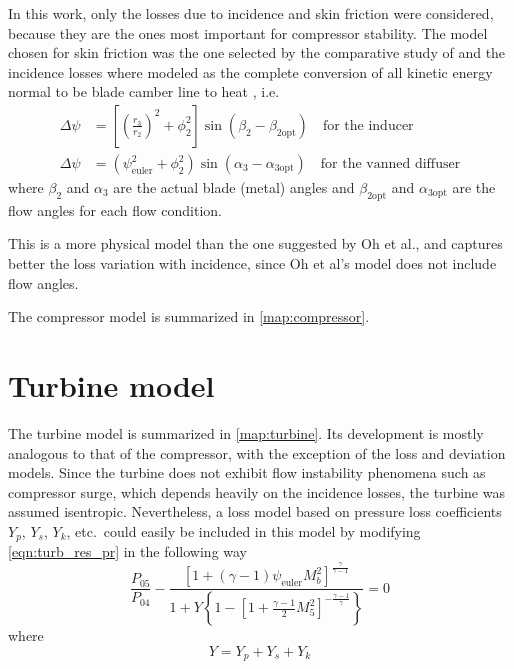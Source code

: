 \documentclass[tcc]{subfiles}
\begin{document}
In this work, only the losses due to incidence and skin friction were considered, because they are the ones most important for compressor stability. The model chosen for skin friction was the one selected by the comparative study of \textcite{Oh1997} and the incidence losses where modeled as the complete conversion of all kinetic energy normal to be blade camber line to heat \cite{Galvas1973}, i.e.\
\begin{align}
    \Delta \psi &= \left[\left(\frac{r_3}{r_2}\right)^2 + \phi_2^2\right]
    \sin(\beta_2 - \beta_{2\text{opt}}) \quad\text{for the inducer} \\
    \Delta \psi &= (\psi_{\text{euler}}^2 + \phi_2^2) \sin(\alpha_3-\alpha_{3\text{opt}}) \quad\text{for the vanned diffuser}
\end{align}
where $\beta_2$ and $\alpha_3$ are the actual blade (metal) angles and $\beta_{2\text{opt}}$ and $\alpha_{3\text{opt}}$ are the flow angles for each flow condition.

This is a more physical model than the one suggested by Oh et al., and captures better the loss variation with incidence, since Oh et al's model does not include flow angles. 

The compressor model is summarized in \cref{map:compressor}.

\section{Turbine model}


The turbine model is summarized in \cref{map:turbine}. 
Its development is mostly analogous to that of the compressor, with the exception of the loss and deviation models. 
Since the turbine does not exhibit flow instability phenomena such as compressor surge, 
which depends heavily on the incidence losses, 
the turbine was assumed isentropic. 
Nevertheless, a loss model based on pressure loss coefficients $Y_p$, $Y_s$, $Y_k$, etc.\ 
could easily be included in this model by modifying \cref{eqn:turb_res_pr} in the following way
\begin{equation}
    \frac{P_{05}}{P_{04}} -\frac{[1 + (\gamma-1)\psi_{\text{euler}} M_b^2]^{\frac{\gamma}{\gamma-1}}}{1+Y\left\{1-\left[1+\tfrac{\gamma-1}{2}M_5^2\right]^{-\frac{\gamma-1}{\gamma}}\right\}} = 0 
\end{equation}
where
\begin{equation}
    Y = Y_p + Y_s + Y_k
\end{equation}
\end{document}
